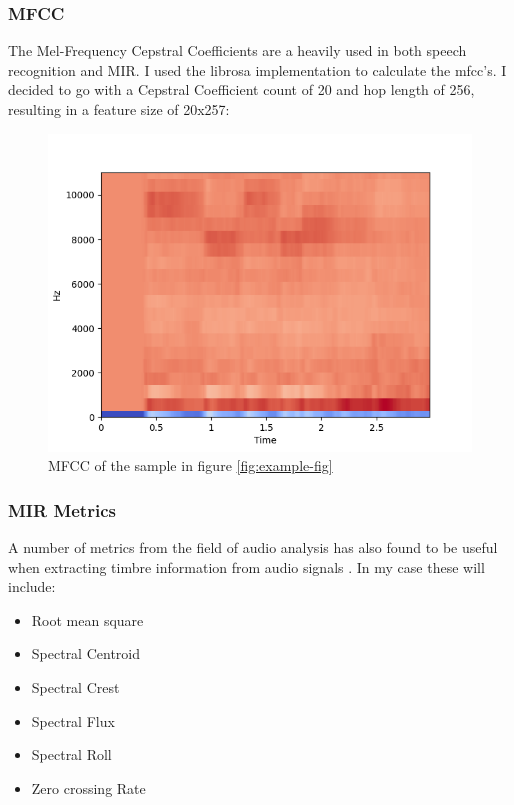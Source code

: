 \documentclass[11pt]{article}
\begin{document}
\subsubsection{MFCC}
\label{sec:org70aa9fd}

The Mel-Frequency Cepstral Coefficients are a heavily used in both speech recognition and MIR. \cite{medium,klustr,Racharla_2020,article}
I used the librosa implementation to calculate the mfcc's. I decided to go with a Cepstral Coefficient count of 20 and hop length of 256, resulting in a feature size of 20x257:

\begin{figure}[H]
\centering
\includegraphics[width=.7\linewidth]{./Figures/mfcc.png}
\caption{\label{fig:mfcc}MFCC of the sample in figure \ref{fig:example-fig}}
\end{figure}

\subsubsection{MIR Metrics}
\label{sec:orgb3249b0}

A number of metrics from the field of audio analysis has also found to be useful when extracting timbre information from audio signals \cite{article,klustr}. In my case these will include:

\begin{itemize}
\item Root mean square
\item Spectral Centroid
\item Spectral Crest
\item Spectral Flux
\item Spectral Roll
\item Zero crossing Rate
\end{itemize}
\end{document}
